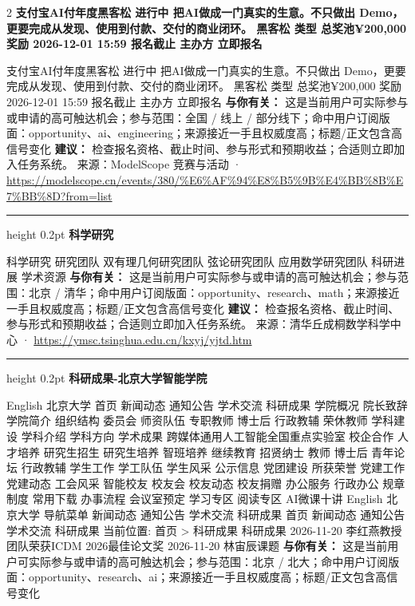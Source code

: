 \documentclass[10.5pt]{ctexart}
\begin{document}
\begin{multicols}{2}
{\large\bfseries 支付宝AI付年度黑客松 进行中 把AI做成一门真实的生意。不只做出 Demo，更要完成从发现、使用到付款、交付的商业闭环。 黑客松 类型 总奖池¥200,000 奖励 2026-12-01 15:59 报名截止 主办方 立即报名}\par
支付宝AI付年度黑客松 进行中 把AI做成一门真实的生意。不只做出 Demo，更要完成从发现、使用到付款、交付的商业闭环。 黑客松 类型 总奖池¥200,000 奖励 2026-12-01 15:59 报名截止 主办方 立即报名
\textbf{与你有关：} 这是当前用户可实际参与或申请的高可触达机会；参与范围：全国 / 线上 / 部分线下；命中用户订阅版面：opportunity、ai、engineering；来源接近一手且权威度高；标题/正文包含高信号变化
\textbf{建议：} 检查报名资格、截止时间、参与形式和预期收益；合适则立即加入任务系统。
{\footnotesize\color{ormuted} 来源：ModelScope 竞赛与活动 · \url{https://modelscope.cn/events/380/%E6%AF%94%E8%B5%9B%E4%BB%8B%E7%BB%8D?from=list}}
\vspace{2mm}
\hrule height 0.2pt
\vspace{2mm}
{\large\bfseries 科学研究}\par
科学研究 研究团队 双有理几何研究团队 弦论研究团队 应用数学研究团队 科研进展 学术资源
\textbf{与你有关：} 这是当前用户可实际参与或申请的高可触达机会；参与范围：北京 / 清华；命中用户订阅版面：opportunity、research、math；来源接近一手且权威度高；标题/正文包含高信号变化
\textbf{建议：} 检查报名资格、截止时间、参与形式和预期收益；合适则立即加入任务系统。
{\footnotesize\color{ormuted} 来源：清华丘成桐数学科学中心 · \url{https://ymsc.tsinghua.edu.cn/kxyj/yjtd.htm}}
\vspace{2mm}
\hrule height 0.2pt
\vspace{2mm}
{\large\bfseries 科研成果-北京大学智能学院}\par
English 北京大学 首页 新闻动态 通知公告 学术交流 科研成果 学院概况 院长致辞 学院简介 组织结构 委员会 师资队伍 专职教师 博士后 行政教辅 荣休教师 学科建设 学科介绍 学科方向 学术成果 跨媒体通用人工智能全国重点实验室 校企合作 人才培养 研究生招生 研究生培养 智班培养 继续教育 招贤纳士 教师 博士后 青年论坛 行政教辅 学生工作 学工队伍 学生风采 公示信息 党团建设 所获荣誉 党建工作 党建动态 工会风采 智能校友 校友会 校友动态 校友捐赠 办公服务 行政办公 规章制度 常用下载 办事流程 会议室预定 学习专区 阅读专区 AI微课十讲 English 北京大学 导航菜单 新闻动态 通知公告 学术交流 科研成果 首页 新闻动态 通知公告 学术交流 科研成果 当前位置: 首页 > 科研成果 科研成果 2026-11-20 李红燕教授团队荣获ICDM 2026最佳论文奖 2026-11-20 林宙辰课题
\textbf{与你有关：} 这是当前用户可实际参与或申请的高可触达机会；参与范围：北京 / 北大；命中用户订阅版面：opportunity、research、ai；来源接近一手且权威度高；标题/正文包含高信号变化

\end{multicols}
\end{document}

